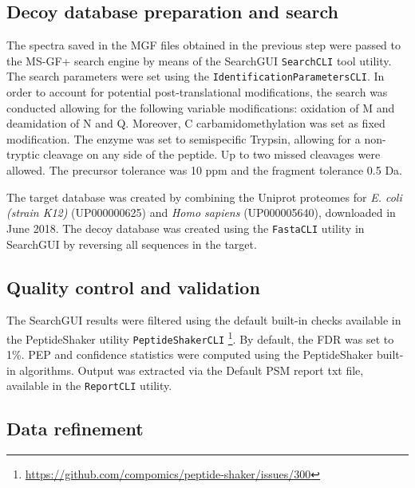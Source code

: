\documentclass[11pt, a4paper]{report}
\begin{document}

\subsection{Decoy database preparation and search}

The spectra saved in the MGF files obtained in the previous step were passed to the MS-GF+ search engine \cite{Kim2014} by means of the SearchGUI \texttt{SearchCLI} tool \cite{Barsnes2018} utility. The search parameters were set using the \texttt{IdentificationParametersCLI}. In order to account for potential post-translational modifications, the search was conducted allowing for the following variable modifications: oxidation of M and deamidation of N and Q. Moreover, C carbamidomethylation was set as fixed modification. The enzyme was set to semispecific Trypsin, allowing for a non-tryptic cleavage on any side of the peptide. Up to two missed cleavages were allowed. The precursor tolerance was 10 ppm and the fragment tolerance 0.5 Da. 


The target database was created by combining the Uniprot proteomes for \textit{E. coli (strain K12)} (UP000000625) and \textit{Homo sapiens} (UP000005640), downloaded in June 2018. The decoy database was created using the \texttt{FastaCLI} utility in SearchGUI by reversing all sequences in the target.

\subsection{Quality control and validation}

The SearchGUI results were filtered using the default built-in checks available in the PeptideShaker utility \texttt{PeptideShakerCLI} \cite{Vaudel2015} \footnote{\href{https://github.com/compomics/peptide-shaker/issues/300}{https://github.com/compomics/peptide-shaker/issues/300}}. By default, the FDR was set to 1\%. PEP and confidence statistics were computed using the PeptideShaker built-in algorithms. Output was extracted via the Default PSM report txt file, available in the \texttt{ReportCLI} utility.


\subsection{Data refinement}
\end{document}
